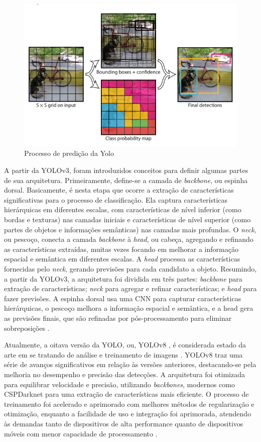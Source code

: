 \begin{figure}[!h]
    \center
    \begin{minipage}{0.9\linewidth}
    \center
    \captionsetup{justification=centering,margin=0.5cm,font=small}
    \includegraphics[width=0.7\linewidth]{img/cap2/processo-predicao-YOLO.jpeg}
    \caption{ Processo de predição da Yolo \cite{redmon2016youlookonce}} \label{fig:yolo}
    \end{minipage}
\end{figure}
A partir da YOLOv3, foram introduzidos conceitos para definir algumas partes de sua arquitetura. Primeiramente, define-se a camada de \textit{backbone}, ou espinha dorsal. Basicamente, é nesta etapa que ocorre a extração de características significativas para o processo de classificação. Ela captura características hierárquicas em diferentes escalas, com características de nível inferior (como bordas e texturas) nas camadas iniciais e características de nível superior (como partes de objetos e informações semânticas) nas camadas mais profundas. O \textit{neck}, ou pescoço, conecta a camada \textit{backbone} à \textit{head}, ou cabeça, agregando e refinando as características extraídas, muitas vezes focando em melhorar a informação espacial e semântica em diferentes escalas. A \textit{head} processa as características fornecidas pelo \textit{neck}, gerando previsões para cada candidato a objeto. Resumindo, a partir da YOLOv3, a arquitetura foi dividida em três partes: \textit{backbone} para extração de características; \textit{neck} para agregar e refinar características; e \textit{head} para fazer previsões. A espinha dorsal usa uma CNN para capturar características hierárquicas, o pescoço melhora a informação espacial e semântica, e a head gera as previsões finais, que são refinadas por pós-processamento para eliminar sobreposições \cite{terven2023comprehensive}.

Atualmente, a oitava versão da YOLO, ou, YOLOv8 , é considerada estado da arte em se tratando de análise e treinamento de imagens \cite{ultralytics2024}. YOLOv8 traz uma série de avanços significativos em relação às versões anteriores, destacando-se pela melhoria no desempenho e precisão das detecções. A arquitetura foi otimizada para equilibrar velocidade e precisão, utilizando \textit{backbones}, modernos como CSPDarknet para uma extração de características mais eficiente. O processo de treinamento foi acelerado e aprimorado com melhores métodos de regularização e otimização, enquanto a facilidade de uso e integração foi aprimorada, atendendo às demandas tanto de dispositivos de alta performance quanto de dispositivos móveis com menor capacidade de processamento \cite{hussain2023yolo}.


